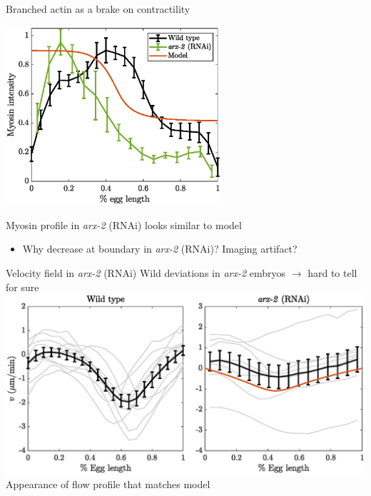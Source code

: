 \documentclass{beamer}
\newcommand{\6}[1]{#1_{\text{6}}}
\newcommand{\3}[1]{#1_{\text{3}}}
\begin{document}
\begin{frame}{Branched actin as a brake on contractility}
\begin{center}
\includegraphics[width=0.6\textwidth]{MyosinIntensityExpsSim.eps}
\end{center}
Myosin profile in \emph{arx-2} (RNAi) looks similar to model
\begin{itemize}
\item Why decrease at boundary in \emph{arx-2} (RNAi)? Imaging artifact?
\end{itemize}
\end{frame}



\begin{frame}{Velocity field in \emph{arx-2} (RNAi)}
Wild deviations in \emph{arx-2} embryos $\rightarrow$ hard to tell for sure
\includegraphics[width=\textwidth]{FlowProfilesWTArx2WMod.eps}
Appearance of flow profile that matches model
\end{frame}
\end{document}
